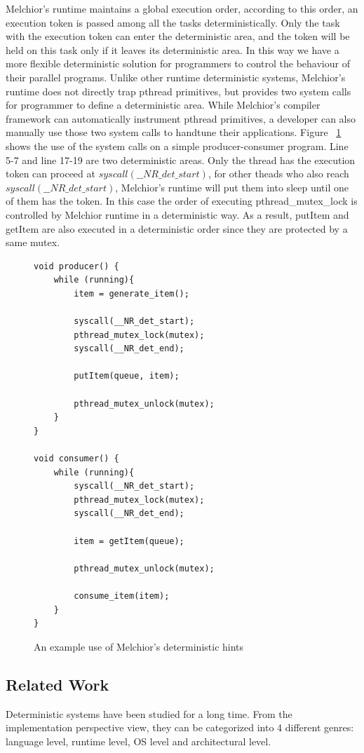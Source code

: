 \documentclass{sig-alternate}
\begin{document}
Melchior's runtime maintains a global execution order, according to this order, an execution token is passed among all the tasks deterministically. Only the task with the execution token can enter the deterministic area, and the token will be held on this task only if it leaves its deterministic area. In this way we have a more flexible deterministic solution for programmers to control the behaviour of their parallel programs. Unlike other runtime deterministic systems, Melchior's runtime does not directly trap pthread primitives, but provides two system calls for programmer to define a deterministic area. While Melchior's compiler framework can automatically instrument pthread primitives, a developer can also manually use those two system calls to handtune their applications. Figure ~\ref{fig:p1-1} shows the use of the system calls on a simple producer-consumer program. Line 5-7 and line 17-19 are two deterministic areas. Only the thread has the execution token can proceed at $syscall(\_\_NR\_det\_start)$, for other theads who also reach $syscall(\_\_NR\_det\_start)$, Melchior's runtime will put them into sleep until one of them has the token. In this case the order of executing pthread\_mutex\_lock is controlled by Melchior runtime in a deterministic way. As a result, putItem and getItem are also executed in a deterministic order since they are protected by a same mutex.

\begin{figure}
\centering
\begin{lstlisting}[frame=single,breaklines=true]
void producer() {
	while (running){
		item = generate_item();

		syscall(__NR_det_start);
		pthread_mutex_lock(mutex);
		syscall(__NR_det_end);
    
		putItem(queue, item);
    
		pthread_mutex_unlock(mutex);
	}
}

void consumer() {
	while (running){
		syscall(__NR_det_start);
		pthread_mutex_lock(mutex);
		syscall(__NR_det_end);
    
		item = getItem(queue);
    
		pthread_mutex_unlock(mutex);
		
		consume_item(item);
	}
}
\end{lstlisting}
\caption{An example use of Melchior's deterministic hints}
\label{fig:p1-1}
\end{figure}

\subsection{Related Work}
Deterministic systems have been studied for a long time. From the implementation perspective view, they can be categorized into 4 different genres: language level, runtime level, OS level and architectural level.
\end{document}
